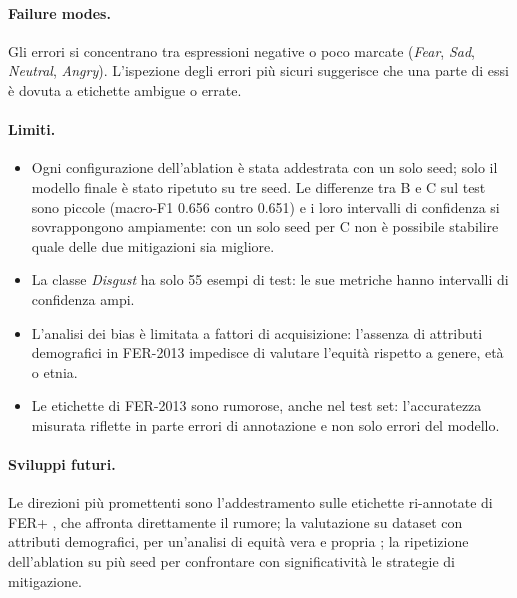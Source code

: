 \documentclass[11pt,a4paper]{article}
\begin{document}
\paragraph{Failure modes.} Gli errori si concentrano tra espressioni negative o poco marcate (\textit{Fear}, \textit{Sad}, \textit{Neutral}, \textit{Angry}). L'ispezione degli errori più sicuri suggerisce che una parte di essi è dovuta a etichette ambigue o errate.

\paragraph{Limiti.}
\begin{itemize}
    \item Ogni configurazione dell'ablation è stata addestrata con un solo seed; solo il modello finale è stato ripetuto su tre seed. Le differenze tra B e C sul test sono piccole (macro-F1 0.656 contro 0.651) e i loro intervalli di confidenza si sovrappongono ampiamente: con un solo seed per C non è possibile stabilire quale delle due mitigazioni sia migliore.
    \item La classe \textit{Disgust} ha solo 55 esempi di test: le sue metriche hanno intervalli di confidenza ampi.
    \item L'analisi dei bias è limitata a fattori di acquisizione: l'assenza di attributi demografici in FER-2013 impedisce di valutare l'equità rispetto a genere, età o etnia.
    \item Le etichette di FER-2013 sono rumorose, anche nel test set: l'accuratezza misurata riflette in parte errori di annotazione e non solo errori del modello.
\end{itemize}

\paragraph{Sviluppi futuri.} Le direzioni più promettenti sono l'addestramento sulle etichette ri-annotate di FER+ \cite{barsoum2016ferplus}, che affronta direttamente il rumore; la valutazione su dataset con attributi demografici, per un'analisi di equità vera e propria \cite{xu2020bias}; la ripetizione dell'ablation su più seed per confrontare con significatività le strategie di mitigazione.



\end{document}
